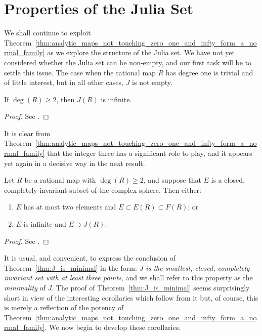 \section{Properties of the Julia Set}
\label{properties_of_the_Julia_set}

We shall continue to exploit
Theorem~\ref{thm:analytic_maps_not_touching_zero_one_and_infty_form_a_normal_family}
as we explore the structure of the Julia set. We have not yet considered whether
the Julia set can be non-empty, and our first task will be to settle this
issue. The case when the rational map $R$ has degree one is trivial and of
little interest, but in all other cases, $J$ is not empty.

\begin{theorem}[$J$ is infinite]
    \label{thm:J_is_infinite}
    If $\deg(R) \geq 2$, then $J(R)$ is infinite.
\end{theorem}
\begin{proof}
    See \cite[67]{Beardon1991}.
\end{proof}

It is clear from
Theorem~\ref{thm:analytic_maps_not_touching_zero_one_and_infty_form_a_normal_family}
that the integer three has a significant role to play, and it appears yet again
in a decisive way in the next result.

\begin{theorem}[$J$ is minimal]
    \label{thm:J_is_minimal}
    Let $R$ be a rational map with $\deg(R) \geq 2$, and suppose that $E$ is a
    closed, completely invariant subset of the complex sphere. Then either:
    \begin{enumerate}[label=(\roman*)]
        \item $E$ has at most two elements and $E \subset E(R) \subset F(R)$; or
        \item $E$ is infinite and $E \supset J(R)$.
    \end{enumerate}
\end{theorem}
\begin{proof}
    See \cite[68]{Beardon1991}.
\end{proof}

It is usual, and convenient, to express the conclusion of
Theorem~\ref{thm:J_is_minimal} in the form: \emph{$J$ is the smallest, closed,
completely invariant set with at least three points}, and we shall refer to this
property as the \emph{minimality} of $J$. The proof of
Theorem~\ref{thm:J_is_minimal} seems surprisingly short in view of the
interesting corollaries which follow from it but, of course, this is merely a
reflection of the potency of
Theorem~\ref{thm:analytic_maps_not_touching_zero_one_and_infty_form_a_normal_family}.
We now begin to develop these corollaries.

